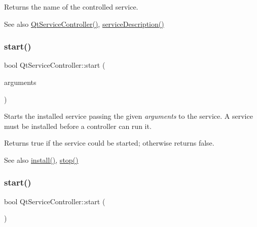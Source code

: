 Returns the name of the controlled service.

\begin{DoxySeeAlso}{See also}
\hyperlink{class_qt_service_controller_ab5c5bb7d168d2e59f0784ded380d7adf}{Qt\+Service\+Controller()}, \hyperlink{class_qt_service_controller_a503c0fadf098b4c5bbccbb2a57f911e2}{service\+Description()} 
\end{DoxySeeAlso}
\mbox{\label{class_qt_service_controller_a70f274d3f4f5a5fea60b8fd7331b31fb}} 
\subsubsection{\texorpdfstring{start()}{start()}\hspace{0.1cm}{\footnotesize\ttfamily [1/2]}}
{\footnotesize\ttfamily bool Qt\+Service\+Controller\+::start (\begin{DoxyParamCaption}\item[{const Q\+String\+List \&}]{arguments }\end{DoxyParamCaption})}

Starts the installed service passing the given {\itshape arguments} to the service. A service must be installed before a controller can run it.

Returns true if the service could be started; otherwise returns false.

\begin{DoxySeeAlso}{See also}
\hyperlink{class_qt_service_controller_a7e2b85e911ff152557dd25959e76094b}{install()}, \hyperlink{class_qt_service_controller_ad06afa647666769e309474b18bf7cf90}{stop()} 
\end{DoxySeeAlso}
\mbox{\label{class_qt_service_controller_a5e9d6da5081d70f31611456d0ef0687e}} 
\subsubsection{\texorpdfstring{start()}{start()}\hspace{0.1cm}{\footnotesize\ttfamily [2/2]}}
{\footnotesize\ttfamily bool Qt\+Service\+Controller\+::start (\begin{DoxyParamCaption}\item[{void}]{ }\end{DoxyParamCaption})}

